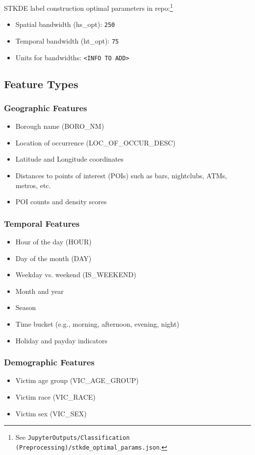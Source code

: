\documentclass{article}
\begin{document}
STKDE label construction optimal parameters in repo:\footnote{See \texttt{JupyterOutputs/Classification (Preprocessing)/stkde\_optimal\_params.json}.}
\begin{itemize}
	\item Spatial bandwidth (hs\_opt): \texttt{250}
	\item Temporal bandwidth (ht\_opt): \texttt{75}
	\item Units for bandwidths: \texttt{<INFO TO ADD>}
\end{itemize}

\subsection{Feature Types}

\subsubsection{Geographic Features}
\begin{itemize}
\item Borough name (BORO\_NM)
\item Location of occurrence (LOC\_OF\_OCCUR\_DESC)
\item Latitude and Longitude coordinates
\item Distances to points of interest (POIs) such as bars, nightclubs, ATMs, metros, etc.
\item POI counts and density scores
\end{itemize}

\subsubsection{Temporal Features}
\begin{itemize}
\item Hour of the day (HOUR)
\item Day of the month (DAY)
\item Weekday vs. weekend (IS\_WEEKEND)
\item Month and year
\item Season
\item Time bucket (e.g., morning, afternoon, evening, night)
\item Holiday and payday indicators
\end{itemize}

\subsubsection{Demographic Features}
\begin{itemize}
\item Victim age group (VIC\_AGE\_GROUP)
\item Victim race (VIC\_RACE)
\item Victim sex (VIC\_SEX)
\end{itemize}
\end{document}
